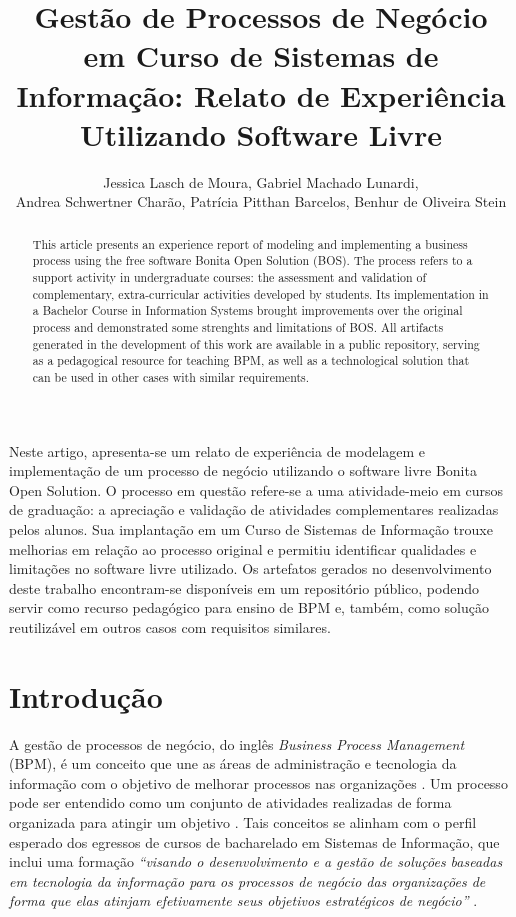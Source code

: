 \documentclass[12pt]{article}
\title{Gestão de Processos de Negócio em Curso de Sistemas de Informação: Relato de Experiência Utilizando Software Livre}
\author{Jessica Lasch de Moura\inst{1}, Gabriel Machado Lunardi\inst{1},\\
Andrea Schwertner Charão\inst{1}, Patrícia Pitthan Barcelos\inst{1}, Benhur de Oliveira Stein\inst{1}}
\begin{document}
\maketitle


\begin{resumo}
Neste artigo, apresenta-se um relato de experiência de modelagem e implementação de um processo de negócio utilizando o software livre Bonita Open Solution. O processo em questão refere-se a uma atividade-meio em cursos de graduação: a apreciação e validação de atividades complementares realizadas pelos alunos. Sua implantação em um Curso de Sistemas de Informação trouxe melhorias em relação ao processo original e permitiu identificar qualidades e limitações no software livre utilizado. Os artefatos gerados no desenvolvimento deste trabalho encontram-se disponíveis em um repositório público, podendo servir como recurso pedagógico para ensino de BPM e, também, como solução reutilizável em outros casos com requisitos similares.
\end{resumo}


\begin{abstract}
This article presents an experience report of modeling and implementing a business process using the free software Bonita Open Solution (BOS). The process refers to a support activity in undergraduate courses: the assessment and validation of complementary, extra-curricular activities developed by students. Its implementation in a Bachelor Course in Information Systems brought improvements over the original process and demonstrated some strenghts and limitations of BOS. All artifacts generated in the development of this work are available in a public repository, serving as a pedagogical resource for teaching BPM, as well as a technological solution that can be used in other cases with similar requirements.
\end{abstract}


\section{Introdução}

A gestão de processos de negócio, do inglês \emph{Business Process Management} (BPM), é um conceito que une as áreas de administração e tecnologia da informação com o objetivo de melhorar processos nas organizações \cite{weske}. Um processo pode ser entendido como um conjunto de atividades realizadas de forma organizada para atingir um objetivo \cite{ABPMP}. Tais conceitos se alinham com o perfil esperado dos egressos de cursos de bacharelado em Sistemas de Informação, que inclui uma formação \emph{“visando o desenvolvimento e a gestão de soluções baseadas em tecnologia da informação para os processos de negócio das organizações de forma que elas atinjam efetivamente seus objetivos estratégicos de negócio”} \cite{parecer:136}.
\end{document}
